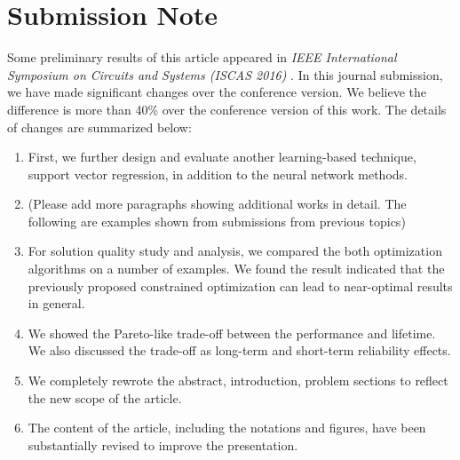 %




\section{Submission Note}


Some preliminary results of this article appeared in {\it IEEE
International Symposium on Circuits and Systems (ISCAS 2016)
}\cite{zhao2016learning}. In this journal submission, we have made
significant changes over the conference version. We believe the
difference is more than 40\% over the conference version of this
work. The details of changes are summarized below:
\begin{enumerate}

\item First, we further design and evaluate another learning-based technique,
    support vector regression, in addition to the neural network methods.

\item (Please add more paragraphs showing additional works in detail. The
    following are examples shown from submissions from previous topics)

\item For solution quality study and analysis, we compared the both
  optimization algorithms on a number of examples. We found the result
  indicated that the previously proposed constrained optimization can
  lead to near-optimal results in general.

\item We showed the Pareto-like trade-off between the performance and
lifetime. We also discussed the trade-off as long-term and short-term
reliability effects.

\item We completely rewrote the abstract, introduction, problem
sections to reflect the new scope of the article.

\item The content of the article, including the notations and figures,
have been substantially revised to improve the presentation.


\end{enumerate}



%
